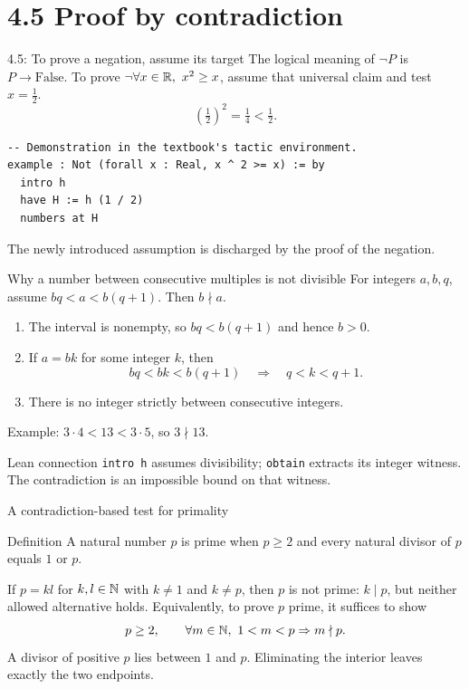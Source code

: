 \section{4.5 Proof by contradiction}
\begin{frame}[fragile]{4.5: To prove a negation, assume its target}
The logical meaning of $\neg P$ is $P\to\mathrm{False}$.
To prove $\neg\forall x\in\mathbb{R},\ x^2\ge x$, assume that universal claim and test $x=\tfrac12$.
\[
\left(\tfrac12\right)^2=\tfrac14<\tfrac12.
\]
\begin{lstlisting}
-- Demonstration in the textbook's tactic environment.
example : Not (forall x : Real, x ^ 2 >= x) := by
  intro h
  have H := h (1 / 2)
  numbers at H
\end{lstlisting}
The newly introduced assumption is discharged by the proof of the negation.
\end{frame}

\begin{frame}{Why a number between consecutive multiples is not divisible}
For integers $a,b,q$, assume $bq<a<b(q+1)$. Then $b\nmid a$.
\begin{enumerate}
\item The interval is nonempty, so $bq<b(q+1)$ and hence $b>0$.
\item If $a=bk$ for some integer $k$, then
\[
bq<bk<b(q+1)\quad\Rightarrow\quad q<k<q+1.
\]
\item There is no integer strictly between consecutive integers.
\end{enumerate}
Example: $3\cdot4<13<3\cdot5$, so $3\nmid13$.
\begin{block}{Lean connection}
\texttt{intro h} assumes divisibility; \texttt{obtain} extracts its integer witness. The contradiction is an impossible bound on that witness.
\end{block}
\end{frame}

\begin{frame}{A contradiction-based test for primality}
\begin{block}{Definition}
A natural number $p$ is prime when $p\ge2$ and every natural divisor of $p$ equals $1$ or $p$.
\end{block}
If $p=kl$ for $k,l\in\mathbb{N}$ with $k\ne1$ and $k\ne p$, then $p$ is not prime:
$k\mid p$, but neither allowed alternative holds.
\medskip
Equivalently, to prove $p$ prime, it suffices to show
\[
p\ge2,\qquad \forall m\in\mathbb{N},\ 1<m<p\Rightarrow m\nmid p.
\]
A divisor of positive $p$ lies between $1$ and $p$. Eliminating the interior leaves exactly the two endpoints.
\end{frame}

